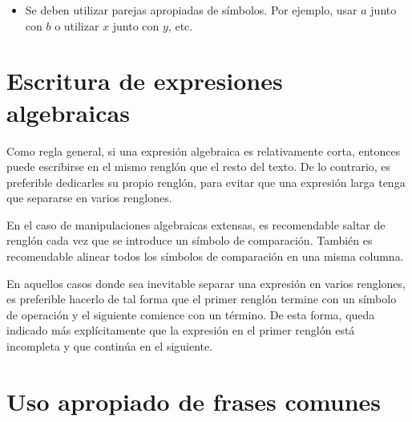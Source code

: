 \begin{itemize}
    \item Se deben utilizar parejas apropiadas de símbolos. Por ejemplo, usar
    $a$ junto con $b$ o utilizar $x$ junto con $y$, etc.

\end{itemize}

\section{Escritura de expresiones algebraicas}

Como regla general, si una expresión algebraica es relativamente corta,
entonces puede escribirse en el mismo renglón que el resto del texto.
De lo contrario, es preferible dedicarles su propio renglón, para evitar 
que una expresión larga tenga que separarse en varios renglones. 

En el caso de manipulaciones algebraicas extensas, es 
recomendable saltar de renglón cada vez que se introduce
un símbolo de comparación. También es recomendable alinear todos los
símbolos de comparación en una misma columna. 

En aquellos casos donde sea inevitable separar una expresión en varios 
renglones, es preferible hacerlo de tal forma que el primer renglón termine 
con un símbolo de operación y el siguiente comience con un término. 
De esta forma, queda indicado más explícitamente que la expresión en el primer 
renglón está incompleta y que continúa en el siguiente. 

\section{Uso apropiado de frases comunes}

